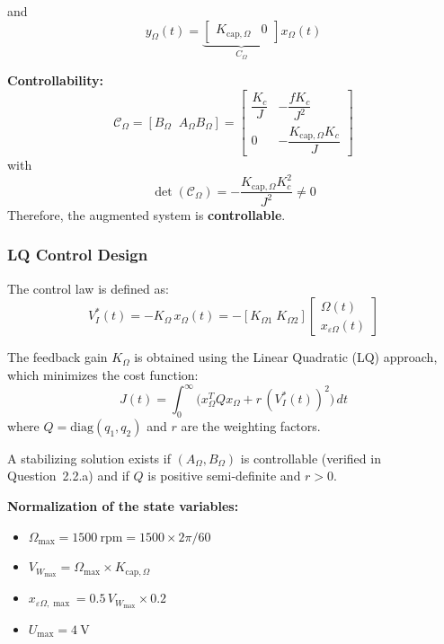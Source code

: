 \documentclass{rapportCS}
\begin{document}
and
\begin{equation*}
y_\Omega(t) =
\underbrace{
\begin{bmatrix}
K_{\mathrm{cap},\Omega} & 0
\end{bmatrix}}_{C_\Omega}
x_\Omega(t)
\end{equation*}

\noindent\textbf{Controllability:}
\[
\mathcal{C}_\Omega = [B_\Omega \;\; A_\Omega B_\Omega]
=
\begin{bmatrix}
\dfrac{K_c}{J} & -\dfrac{f K_c}{J^2} \\[6pt]
0 & -\dfrac{K_{\mathrm{cap},\Omega} K_c}{J}
\end{bmatrix}
\]
with
\[
\det(\mathcal{C}_\Omega) = -\frac{K_{\mathrm{cap},\Omega} K_c^2}{J^2} \neq 0
\]
Therefore, the augmented system is \textbf{controllable}.

\subsubsection{LQ Control Design}

The control law is defined as:
\begin{equation*}
V_I^*(t) = -K_\Omega\,x_\Omega(t)
= -[K_{\Omega1}\; K_{\Omega2}]
\begin{bmatrix}
\Omega(t) \\[4pt] x_{\varepsilon\Omega}(t)
\end{bmatrix}
\end{equation*}

The feedback gain $K_\Omega$ is obtained using the Linear Quadratic (LQ) approach, which minimizes the cost function:
\begin{equation*}
J(t) = \int_0^\infty \big(x_\Omega^T Q x_\Omega + r \,(V_I^*(t))^2\big)\,dt
\end{equation*}
where $Q = \mathrm{diag}(q_1, q_2)$ and $r$ are the weighting factors.

A stabilizing solution exists if $(A_\Omega,B_\Omega)$ is controllable (verified in Question~2.2.a) and if
$Q$ is positive semi-definite and $r>0$.

\noindent\textbf{Normalization of the state variables:}
\begin{itemize}
    \item $\Omega_{\max} = 1500~\mathrm{rpm} = 1500 \times 2\pi / 60$
    \item $V_{W_{\max}} = \Omega_{\max} \times K_{\mathrm{cap},\Omega}$
    \item $x_{\varepsilon\Omega,\max} = 0.5\,V_{W_{\max}} \times 0.2$
    \item $U_{\max} = 4~\mathrm{V}$
\end{itemize}
\end{document}
